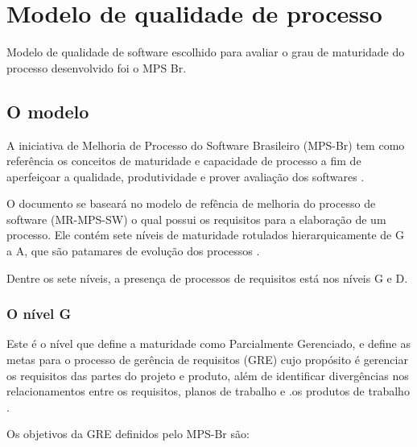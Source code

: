 \chapter[Modelo de qualidade de processo]{Modelo de qualidade de processo}

Modelo de qualidade de software escolhido para avaliar o grau de maturidade do processo desenvolvido foi o MPS Br.

\section{O modelo}

A iniciativa de Melhoria de Processo do Software Brasileiro (MPS-Br) tem como referência os conceitos de maturidade e capacidade de processo a fim de aperfeiçoar a qualidade, produtividade e prover avaliação dos softwares \cite{mpsbr}.

O documento se baseará no modelo de refência de melhoria do processo de software (MR-MPS-SW) o qual possui os requisitos para a elaboração de um processo. Ele contém sete níveis de maturidade rotulados hierarquicamente de G a A, que são patamares de evolução dos processos \cite{mpsbr}.

Dentre os sete níveis, a presença de processos de requisitos está nos níveis G e D.
\subsection{O nível G}

Este é o nível que define a maturidade como Parcialmente Gerenciado, e define as metas para o processo de gerência de requisitos (GRE) cujo propósito é gerenciar os requisitos das partes do projeto e produto, além de identificar divergências nos relacionamentos entre os requisitos, planos de trabalho e .os produtos de trabalho \cite{mpsbr}.

Os objetivos da GRE definidos pelo MPS-Br são:

